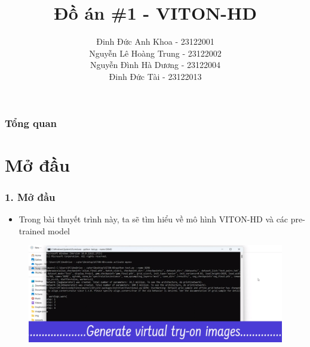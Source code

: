 \documentclass{beamer}
\title[Presentation ]{Đồ án \#1 - VITON-HD
} %
\author{ Đinh Đức Anh Khoa - 23122001 \\ Nguyễn Lê Hoàng Trung - 23122002 \\ Nguyễn Đình Hà Dương - 23122004 \\ Đinh Đức Tài - 23122013
} %
\institute[23TNT1] %
{
FIT@HCMUS \\ %
\medskip
\textit{TPHCM, tháng 12 năm 2023} %
}
\date{} %
\begin{document}
\begin{frame}
\titlepage %
\end{frame}

\begin{frame}
\frametitle{Tổng quan} %
\tableofcontents %
\end{frame}

\section{Mở đầu} 
\begin{frame}
\frametitle{1. Mở đầu}
\begin{itemize}
\item Trong bài thuyết trình này, ta sẽ tìm hiểu về mô hình VITON-HD và các pre-trained model

\end{itemize}

\begin{figure}
    \centering
    \includegraphics[width=1\linewidth]{images/opening.png}
    
    
\end{figure}

\end{frame}
\end{document}
